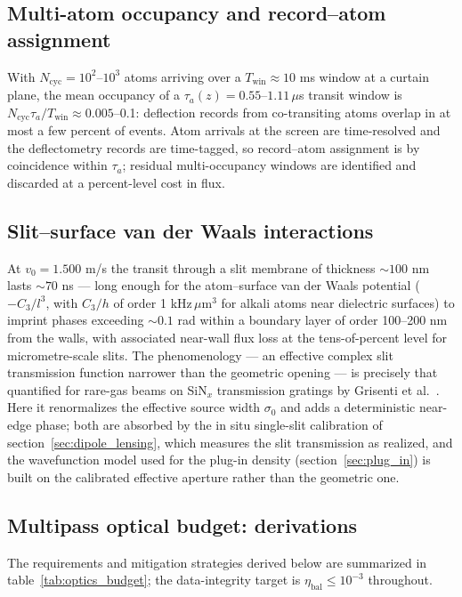 \documentclass[11pt,a4paper]{article}
\begin{document}
\subsection{Multi-atom occupancy and record--atom assignment}
\label{app:budgets_occupancy}
With $N_\text{cyc} = 10^2$--$10^3$ atoms arriving over a $T_\text{win} \approx 10$ ms window at a curtain plane, the mean occupancy of a $\tau_a(z) = 0.55$--$1.11\,\mu$s transit window is $N_\text{cyc}\tau_a/T_\text{win} \approx 0.005$--0.1: deflection records from co-transiting atoms overlap in at most a few percent of events. Atom arrivals at the screen are time-resolved and the deflectometry records are time-tagged, so record--atom assignment is by coincidence within $\tau_a$; residual multi-occupancy windows are identified and discarded at a percent-level cost in flux.

\subsection{Slit--surface van der Waals interactions}
\label{app:budgets_slit}
At $v_0 = 1.500$ m/s the transit through a slit membrane of thickness $\sim 100$ nm lasts $\sim 70$ ns --- long enough for the atom--surface van der Waals potential ($-C_3/l^3$, with $C_3/h$ of order 1 kHz\,$\mu$m$^3$ for alkali atoms near dielectric surfaces) to imprint phases exceeding $\sim 0.1$ rad within a boundary layer of order 100--200 nm from the walls, with associated near-wall flux loss at the tens-of-percent level for micrometre-scale slits. The phenomenology --- an effective complex slit transmission function narrower than the geometric opening --- is precisely that quantified for rare-gas beams on SiN$_x$ transmission gratings by Grisenti et al.~\cite{Grisenti1999}. Here it renormalizes the effective source width $\sigma_0$ and adds a deterministic near-edge phase; both are absorbed by the in situ single-slit calibration of section~\ref{sec:dipole_lensing}, which measures the slit transmission as realized, and the wavefunction model used for the plug-in density (section~\ref{sec:plug_in}) is built on the calibrated effective aperture rather than the geometric one.

\subsection{Multipass optical budget: derivations}
\label{app:budgets_optics}
The requirements and mitigation strategies derived below are summarized in table~\ref{tab:optics_budget}; the data-integrity target is $\eta_\text{bal} \leq 10^{-3}$ throughout.
\end{document}
